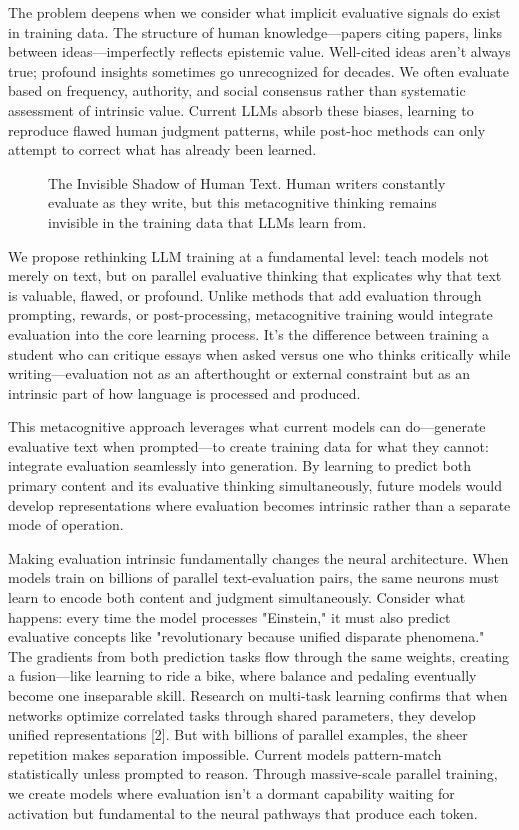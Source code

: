 \documentclass[11pt]{article}
\begin{document}
	The problem deepens when we consider what implicit evaluative signals do exist in training data. The structure of human knowledge---papers citing papers, links between ideas---imperfectly reflects epistemic value. Well-cited ideas aren't always true; profound insights sometimes go unrecognized for decades. We often evaluate based on frequency, authority, and social consensus rather than systematic assessment of intrinsic value. Current LLMs absorb these biases, learning to reproduce flawed human judgment patterns, while post-hoc methods can only attempt to correct what has already been learned.
	
	\begin{figure}[h]
		\centering
		
		\caption{The Invisible Shadow of Human Text. Human writers constantly evaluate as they write, but this metacognitive thinking remains invisible in the training data that LLMs learn from.}
		\label{fig:invisible-shadow}
	\end{figure}
	
	We propose rethinking LLM training at a fundamental level: teach models not merely on text, but on parallel evaluative thinking that explicates why that text is valuable, flawed, or profound. Unlike methods that add evaluation through prompting, rewards, or post-processing, metacognitive training would integrate evaluation into the core learning process. It's the difference between training a student who can critique essays when asked versus one who thinks critically while writing---evaluation not as an afterthought or external constraint but as an intrinsic part of how language is processed and produced.
		
	This metacognitive approach leverages what current models can do—generate evaluative text when prompted—to create training data for what they cannot: integrate evaluation seamlessly into generation. By learning to predict both primary content and its evaluative thinking simultaneously, future models would develop representations where evaluation becomes intrinsic rather than a separate mode of operation.
	
	Making evaluation intrinsic fundamentally changes the neural architecture. When models train on billions of parallel text-evaluation pairs, the same neurons must learn to encode both content and judgment simultaneously. Consider what happens: every time the model processes "Einstein," it must also predict evaluative concepts like "revolutionary because unified disparate phenomena." The gradients from both prediction tasks flow through the same weights, creating a fusion—like learning to ride a bike, where balance and pedaling eventually become one inseparable skill. Research on multi-task learning confirms that when networks optimize correlated tasks through shared parameters, they develop unified representations [2]. But with billions of parallel examples, the sheer repetition makes separation impossible. Current models pattern-match statistically unless prompted to reason. Through massive-scale parallel training, we create models where evaluation isn't a dormant capability waiting for activation but fundamental to the neural pathways that produce each token.
	
\end{document}
